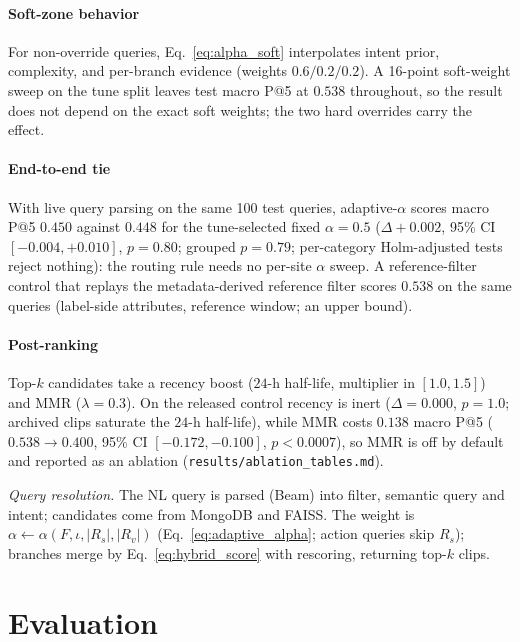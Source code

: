 ﻿\documentclass[conference]{IEEEtran}
\theoremstyle{plain}
\begin{document}
\paragraph*{Soft-zone behavior}
For non-override queries, Eq.~\eqref{eq:alpha_soft} interpolates intent prior, complexity, and per-branch evidence (weights $0.6/\allowbreak 0.2/\allowbreak 0.2$). A 16-point soft-weight sweep on the tune split leaves test macro P@5 at $0.538$ throughout, so the result does not depend on the exact soft weights; the two hard overrides carry the effect.

\paragraph*{End-to-end tie}
With live query parsing on the same 100 test queries, adaptive-$\alpha$ scores macro P@5 $0.450$ against $0.448$ for the tune-selected fixed $\alpha{=}0.5$ ($\Delta{+}0.002$, 95\% CI $[-0.004,+0.010]$, $p{=}0.80$; grouped $p{=}0.79$; per-category Holm-adjusted tests reject nothing): the routing rule needs no per-site $\alpha$ sweep. A reference-filter control that replays the metadata-derived reference filter scores $0.538$ on the same queries (label-side attributes, reference window; an upper bound).

\paragraph*{Post-ranking}
Top-$k$ candidates take a recency boost ($24$-h half-life, multiplier in $[1.0,1.5]$) and MMR ($\lambda{=}0.3$). On the released control recency is inert ($\Delta{=}0.000$, $p{=}1.0$; archived clips saturate the $24$-h half-life), while MMR costs $0.138$ macro P@5 ($0.538{\to}0.400$, 95\% CI $[-0.172,-0.100]$, $p{<}0.0007$), so MMR is off by default and reported as an ablation (\texttt{results/ablation\_tables.md}).

\emph{Query resolution.} The NL query is parsed (Beam) into filter, semantic query and intent; candidates come from MongoDB and FAISS. The weight is $\alpha\leftarrow\alpha(F,\iota,|R_s|,|R_v|)$ (Eq.~\eqref{eq:adaptive_alpha}; action queries skip $R_s$); branches merge by Eq.~\eqref{eq:hybrid_score} with rescoring, returning top-$k$ clips.

\section{Evaluation}\label{sec:eval}
\end{document}
